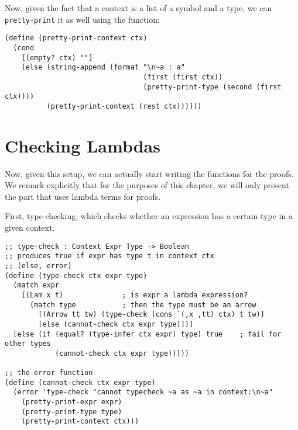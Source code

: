 Now, given the fact that a context is a list of a symbol and a type,
we can \texttt{pretty-print} it as well using the function:
{
  \small
\begin{verbatim}
(define (pretty-print-context ctx)
  (cond
    [(empty? ctx) ""]
    [else (string-append (format "\n~a : a"
                                 (first (first ctx))
                                 (pretty-print-type (second (first ctx))))
          (pretty-print-context (rest ctx)))]))
\end{verbatim}
}

\section{Checking Lambdas}

\indent\indent Now, given this setup, we can actually start writing the functions
for the proofs. We remark explicitly that for the purposes %
of this chapter, we will only present the part that uses lambda terms
for proofs.

First, type-checking, which checks whether an
expression has a certain type in a given context.
{
  \small
\begin{verbatim}
;; type-check : Context Expr Type -> Boolean
;; produces true if expr has type t in context ctx
;; (else, error)
(define (type-check ctx expr type)
  (match expr
    [(Lam x t)              ; is expr a lambda expression?
      (match type           ; then the type must be an arrow
        [(Arrow tt tw) (type-check (cons `(,x ,tt) ctx) t tw)]
        [else (cannot-check ctx expr type)])]
  [else (if (equal? (type-infer ctx expr) type) true    ; fail for other types
            (cannot-check ctx expr type))]))

;; the error function
(define (cannot-check ctx expr type)
  (error 'type-check "cannot typecheck ~a as ~a in context:\n~a"
    (pretty-print-expr expr)
    (pretty-print-type type)
    (pretty-print-context ctx)))
\end{verbatim}
}

